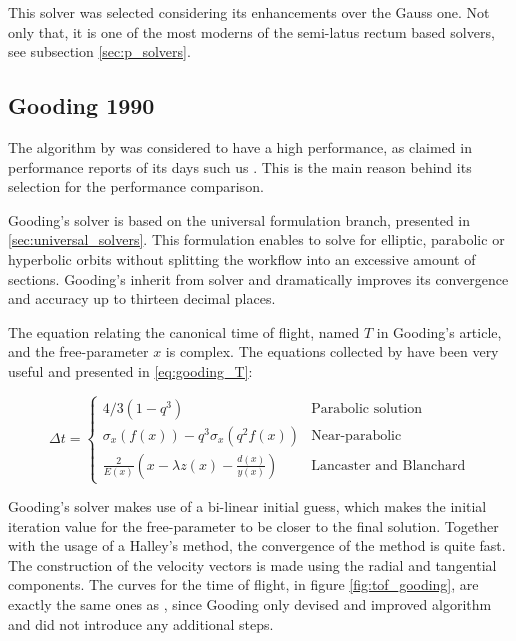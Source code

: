 This solver was selected considering its enhancements over the Gauss one. Not
only that, it is one of the most moderns of the semi-latus rectum based solvers,
see subsection \ref{sec:p_solvers}.


\subsection{Gooding 1990}

The algorithm by \cite{gooding1990} was considered to have a high performance,
as claimed in performance reports of its days such us \cite{klumpp1999}. This is
the main reason behind its selection for the performance comparison.

Gooding's solver is based on the universal formulation branch, presented in
\ref{sec:universal_solvers}. This formulation enables to solve for elliptic,
parabolic or hyperbolic orbits without splitting the workflow into an excessive
amount of sections. Gooding's inherit from \cite{lancaster1970} solver and
dramatically improves its convergence and accuracy up to thirteen decimal
places.

The equation relating the canonical time of flight, named $T$ in Gooding's
article, and the free-parameter $x$ is complex. The equations collected by
\cite{torre2015} have been very useful and presented in \ref{eq:gooding_T}:

\begin{equation}
  \Delta t =
  \begin{cases}
    4/3(1 - q^3)                                                    & \text{Parabolic solution}      \\
    \sigma_x(f(x)) - q^3\sigma_x(q^2f(x))                           & \text{Near-parabolic}          \\
    \frac{2}{E(x)}\left(x - \lambda z(x) - \frac{d(x)}{y(x)}\right) & \text{Lancaster and Blanchard}
  \end{cases}
  \label{eq:gooding_T}
\end{equation}

Gooding's solver makes use of a bi-linear initial guess, which makes the initial
iteration value for the free-parameter to be closer to the final solution.
Together with the usage of a Halley's method, the convergence of the method is
quite fast. The construction of the velocity vectors is made using the radial
and tangential components. The curves for the time of flight, in figure
\ref{fig:tof_gooding}, are exactly the same ones as \cite{lancaster1970}, since
Gooding only devised and improved algorithm and did not introduce any additional
steps.


